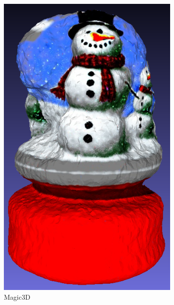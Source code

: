 \begin{figure}[ht]
\begin{subfigure}[b]{0.17\textwidth}
        \includegraphics[width=\textwidth]{etc/a detailed rendering of a snow globe containing a snowman/magic3d/magic3d_globe_result.png}
        \caption{Magic3D}
        \vspace{0.1cm}
    \end{subfigure}
    \begin{subfigure}[b]{0.241\textwidth}
        \centering

\end{subfigure}
\end{figure}
